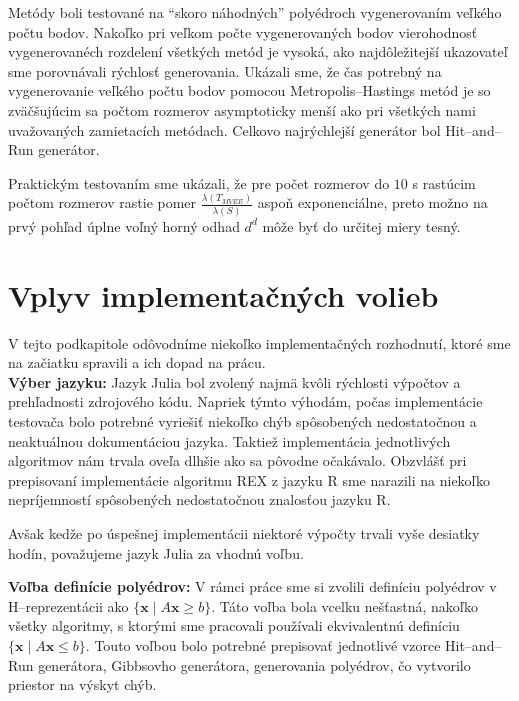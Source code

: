 Metódy boli testované na ``skoro náhodných'' polyédroch vygenerovaním veľkého počtu bodov. Nakoľko pri veľkom počte vygenerovaných bodov vierohodnosť vygenerovanéch rozdelení všetkých metód je vysoká, ako najdôležitejší ukazovateľ sme porovnávali rýchlosť generovania.
Ukázali sme, že čas potrebný na vygenerovanie veľkého počtu bodov pomocou Metropolis--Hastings metód je so zväčšujúcim sa počtom rozmerov asymptoticky menší ako pri všetkých nami uvažovaných zamietacích metódach. Celkovo najrýchlejší generátor bol Hit--and--Run generátor.

Praktickým testovaním sme ukázali, že pre počet rozmerov do $10$ s rastúcim počtom rozmerov rastie pomer $\frac{\lambda(T_{MVEE})}{\lambda(S)}$ aspoň exponenciálne, preto možno na prvý pohľad úplne voľný horný odhad $d^d$ môže byť do určitej miery tesný.\\

\section{Vplyv implementačných volieb}

V tejto podkapitole odôvodníme niekoľko implementačných rozhodnutí, ktoré sme na začiatku spravili a ich dopad na prácu.\\

\textbf{Výber jazyku:} Jazyk Julia bol zvolený najmä kvôli rýchlosti výpočtov a prehľadnosti zdrojového kódu. Napriek týmto výhodám, počas implementácie testovača bolo potrebné vyriešiť niekoľko chýb spôsobených nedostatočnou a neaktuálnou dokumentáciou jazyka. Taktiež implementácia jednotlivých algoritmov nám trvala oveľa dlhšie ako sa pôvodne očakávalo. Obzvlášť pri prepisovaní implementácie algoritmu REX z jazyku R \cite{rex_harman} sme narazili na niekoľko nepríjemností spôsobených nedostatočnou znalosťou jazyku R.

Avšak kedže po úspešnej implementácii niektoré výpočty trvali vyše desiatky hodín, považujeme jazyk Julia za vhodnú voľbu.

\textbf{Voľba definície polyédrov:} V rámci práce sme si zvolili definíciu polyédrov v H--reprezentácii ako $\{ \mathbf x \; | \; A \mathbf x \geq b \}$. Táto voľba bola vcelku nešťastná, nakoľko všetky algoritmy, s ktorými sme pracovali používali ekvivalentnú definíciu $\{ \mathbf x \; | \; A \mathbf x \leq b \}$. Touto voľbou bolo potrebné prepisovať jednotlivé vzorce Hit--and--Run generátora, Gibbsovho generátora, generovania polyédrov, čo vytvorilo priestor na výskyt chýb.


